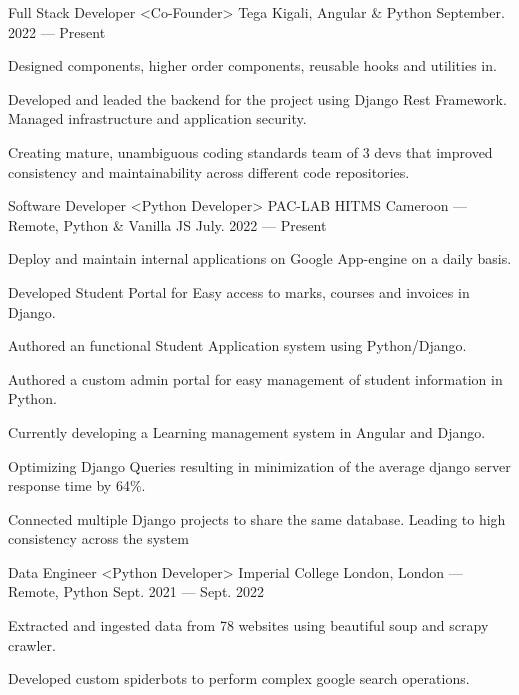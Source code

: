 \begin{cventries}

  \cventry
    {Full Stack Developer <Co-Founder>}
    {Tega}
    {Kigali, Angular \& Python}
    {September. 2022 --- Present}
    {
      \begin{cvitems}
        \item {Designed components, higher order components, reusable hooks and utilities in.}
        \item {Developed and leaded the backend for the project using Django Rest Framework. Managed infrastructure and application security.}
         \item {Creating mature, unambiguous coding standards team of 3 devs that improved consistency and maintainability across different code repositories.}
      \end{cvitems}
    }
  \cventry
    {Software Developer <Python Developer>}
    {PAC-LAB HITMS}
    {Cameroon --- Remote, Python \& Vanilla JS}
    {July. 2022 --- Present}
    {
      \begin{cvitems}
        \item {Deploy and maintain internal applications on Google App-engine on a daily basis.}
        \item {Developed Student Portal for Easy access to marks, courses and invoices in Django.}
        \item {Authored an functional Student Application system using Python/Django.}
        \item {Authored a custom admin portal for easy management of student information in Python.}
        \item {Currently developing a Learning management system in Angular and Django.}
        \item {Optimizing Django Queries resulting in minimization of the average django server response time by 64\%. }
        \item {Connected multiple Django projects to share the same database. Leading to high consistency across the system}
      \end{cvitems}
    }
  \cventry
    {Data Engineer <Python Developer>}
    {Imperial College London,}
    {London --- Remote, Python}
    {Sept. 2021 --- Sept. 2022}
    {
      \begin{cvitems}
        \item {Extracted and ingested data from 78 websites using beautiful soup and scrapy crawler.}
        \item {Developed custom spiderbots to perform complex google search operations.}

\end{cvitems}}
\end{cventries}
